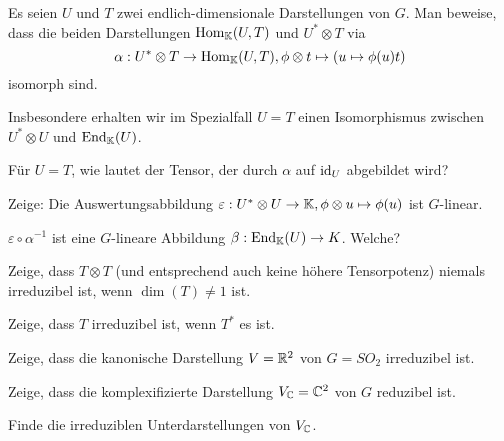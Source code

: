 \begin{sheet}
\begin{problem}[title={Isomorphismus zwischen Tensorprodukt und linearen Abbildungen}]\label{ex:hom_tensor_isomorphismus}
\begin{subproblem}
Es seien $U$ und $T$ zwei endlich-dimensionale Darstellungen von $G$. Man beweise, dass die beiden Darstellungen $\operatorname{Hom}_{\mathbb{K}}(U,T)$ und $U^\ast \otimes T$ via
\[\alpha: U^\ast \otimes T \to \operatorname{Hom}_{\mathbb{K}}(U,T), \phi \otimes t \mapsto (u\mapsto \phi(u)t)\]
isomorph sind.
\end{subproblem}

Insbesondere erhalten wir im Spezialfall $U=T$ einen Isomorphismus zwischen $U^\ast\otimes U$ und $\operatorname{End}_{\mathbb{K}}(U)$.

\begin{subproblem}
Für $U=T$, wie lautet der Tensor, der durch $\alpha$ auf $\operatorname{id}_U$ abgebildet wird?
\end{subproblem}

\begin{subproblem}
Zeige: Die Auswertungsabbildung $\varepsilon: U^\ast \otimes U \to \mathbb{K}, \phi\otimes u\mapsto \phi(u)$ ist $G$-linear.
\end{subproblem}

\begin{subproblem}
$\varepsilon\circ\alpha^{-1}$ ist eine $G$-lineare Abbildung $\beta: \operatorname{End}_{\mathbb{K}}(U) \to K$. Welche?
\end{subproblem}

\end{problem}


\begin{problem}[title={Reduzibilität von $T\otimes T$}]
Zeige, dass $T\otimes T$ (und entsprechend auch keine höhere Tensorpotenz) niemals irreduzibel ist, wenn $\dim(T) \neq 1$ ist.
\end{problem}

\begin{problem}[title={Irreduzibilität von $T^\ast\implies$ Irreduzibilität von $T$?}]
Zeige, dass $T$ irreduzibel ist, wenn $T^\ast$ es ist.
\end{problem}

\begin{problem}[title={Kanonische Darstellung von $SO_2$}]\label{ex:fundamentaldarstellung_von_so2}
\begin{subproblem}
Zeige, dass die kanonische Darstellung $V=\mathbb{R}^2$ von $G=SO_2$ irreduzibel ist.
\end{subproblem}
\begin{subproblem}
Zeige, dass die komplexifizierte Darstellung $V_{\mathbb{C}}=\mathbb{C}^2$ von $G$ reduzibel ist.
\end{subproblem}
\begin{subproblem}
Finde die irreduziblen Unterdarstellungen von $V_{\mathbb{C}}$.


\end{subproblem}
\end{problem}
\end{sheet}
